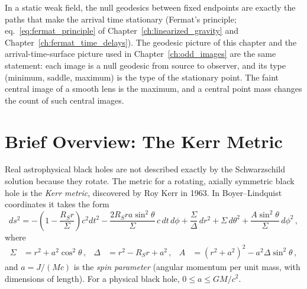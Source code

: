 \begin{bridge}
In a static weak field, the null geodesics between fixed endpoints are
exactly the paths that make the arrival time stationary (Fermat's
principle; eq.~\eqref{eq:fermat_principle} of
Chapter~\ref{ch:linearized_gravity} and Chapter~\ref{ch:fermat_time_delays}).  The geodesic picture of this chapter
and the arrival-time-surface picture used in Chapter~\ref{ch:odd_images} are
the same statement: each image is a null geodesic from source to observer,
and its type (minimum, saddle, maximum) is the type of the stationary
point.  The faint central image of a smooth lens is the maximum, and a
central point mass changes the count of such central images.
\end{bridge}



\section{Brief Overview: The Kerr Metric}
\label{sec:kerr_overview}

Real astrophysical black holes are not described exactly by the
Schwarzschild solution because they rotate.  The metric for a
rotating, axially symmetric black hole is the \emph{Kerr metric},
discovered by Roy Kerr in 1963.  In Boyer--Lindquist coordinates it
takes the form
\begin{equation}
    ds^2 = -\left(1 - \frac{R_S r}{\Sigma}\right) c^2 dt^2
    - \frac{2R_S r a \sin^2\theta}{\Sigma}\, c\, dt\, d\phi
    + \frac{\Sigma}{\Delta}\, dr^2
    + \Sigma\, d\theta^2
    + \frac{A \sin^2\theta}{\Sigma}\, d\phi^2 \,,
    \label{eq:kerr_metric}
\end{equation}
where
\begin{align}
    \Sigma &= r^2 + a^2\cos^2\theta \,, &
    \Delta &= r^2 - R_S r + a^2 \,, &
    A &= (r^2 + a^2)^2 - a^2 \Delta \sin^2\theta \,,
    \label{eq:kerr_functions}
\end{align}
and $a = J/(Mc)$ is the \emph{spin parameter} (angular momentum per
unit mass, with dimensions of length).  For a physical black hole,
$0 \leq a \leq GM/c^2$.

